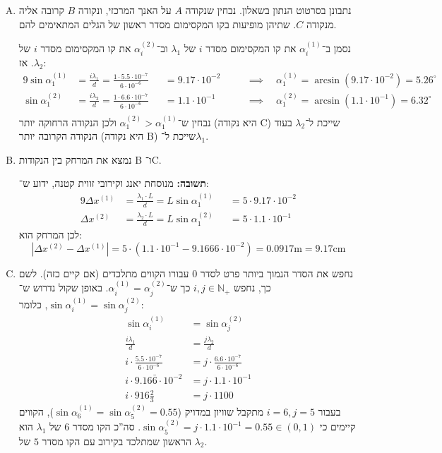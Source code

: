 \documentclass[]{../../../tex/classes/styledArticle}
\renewcommand\lg{\lambda}
\newcommand\ag{\alpha}
\newcommand\mrm[1]{\mathrm{#1}}
\newcommand\sof[1]{|#1|}
\newcommand\N{\mathbb{N}}
\begin{document}
	\begin{enumerate}[(A)]
		\item נתבונן בסרטוט הנתון בשאלון. נבחין שנקודה $A$ על האנך המרכזי, ונקודה $B$ קרובה אליה מנקודה $C$. שתיהן מופיעות בקו המקסימום מסדר ראשון של הגלים המתאימים להם. 
		
		נסמן ב־$\ag_i^{(1)}$ את קו המקסימום מסדר $i$ של $\lg_1$ וב־$\ag_i^{(2)}$ את קו המקסימום מסדר $i$ של $\lg_2$. אז: 
		\begin{alignat*}{9}
			\sin \ag_1^{(1)} &= \frac{i\lg_1}{d} = \frac{1 \cdot 5.5 \cdot 10^{-7}}{6 \cdot 10^{-6}} &&= 9.17\cdot 10^{-2} && \quad\implies \quad \ag_1^{(1)} = \arcsin(9.17 \cdot 10^{-2}) = 5.26^{\circ} \\
			\sin \ag_1^{(2)} &= \frac{i\lg_2}{d} = \frac{1 \cdot 6.6 \cdot 10^{-7}}{6 \cdot 10^{-6}} &&=1.1\cdot 10^{-1} && \quad\implies \quad \ag_1^{(2)} = \arcsin(1.1 \cdot 10^{-1}) = 6.32^{\circ} \\
		\end{alignat*}
		נבחין ש־$\ag_1^{(2)} > \ag_1^{(1)}$ ולכן הנקודה הרחוקה יותר (היא נקודה C) שייכת ל־$\lg_2$ בעוד הנקודה הקרובה יותר (היא נקודה B) שייכת ל־$\lg_1$. 
		\item נמצא את המרחק בין הנקודות B ו־C. 
		
		\textbf{תשובה: }מנוסחת יאנג וקירובי זווית קטנה, ידוע ש־: 
		\begin{alignat*}{9}
			\Delta x^{(1)} &= \frac{\lg_1 \cdot L}{d} = L\sin\ag_1^{(1)} &&=  5 \cdot 9.17\cdot 10^{-2} \\
			\Delta x^{(2)} &= \frac{\lg_2 \cdot L}{d} = L\sin\ag_1^{(2)} &&=  5 \cdot 1.1\cdot 10^{-1}
		\end{alignat*}
		לכן המרחק הוא: 
		\[ \sof{\Delta x^{(2)} - \Delta x^{(1)}} = 5 \cdot {(1.1 \cdot 10^{-1} - 9.1666 \cdot 10^{-2})} = 0.0917\mrm{m} = \bm{9.17\mrm{cm}} \]
		
		\item נחפש את הסדר הנמוך ביותר פרט לסדר $0$ עבורו הקווים מתלכדים (אם קיים כזה). לשם כך, נחפש $i, j \in \N_+$ כך ש־$\ag^{(1)}_i = \ag^{(2)}_j$. באופן שקול נדרוש ש־$\sin \ag^{(1)}_i = \sin \ag^{(2)}_j$, כלומר: 
		\begin{align*}
			\sin \ag^{(1)}_i &= \sin \ag^{(2)}_j \\
			\frac{i \lg_1}{d} &= \frac{j\lg_2}{d} \\
			i \cdot \frac{5.5 \cdot 10^{-7}}{6 \cdot 10^{-6}} &= j \cdot \frac{6.6 \cdot 10^{-7}}{6 \cdot 10^{-6}} \\ 
			i \cdot 9.16\bar{6}\cdot 10^{-2} &= j \cdot 1.1\cdot 10^{-1} \\
			i \cdot 916\frac{2}{3} &= j \cdot 1100
		\end{align*}
		בעבור $i = 6, j = 5$ מתקבל שוויון במדויק ($\sin \ag_6^{(1)} = \sin \ag_5^{(2)} = 0.55$), הקווים קיימים כי $\sin \ag_5^{(2)} = j \cdot 1.1 \cdot 10^{-1} = 0.55 \in (0, 1)$. סה''כ הקו מסדר $6$ של $\lg_1$ הוא הראשון שמתלכד בקירוב עם הקו מסדר $5$ של $\lg_2$. 
		

\end{enumerate}
\end{document}
